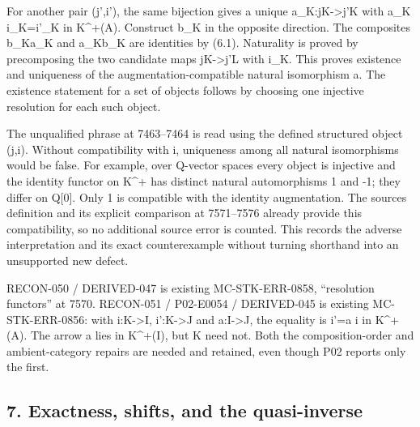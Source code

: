 \documentclass[11pt]{article}
\begin{document}
For another pair (j',\allowbreak{}i')\allowbreak{},\allowbreak{} the same bijection gives a unique a\_\allowbreak{}K:\allowbreak{}jK\allowbreak{}->j'K with a\_\allowbreak{}K i\_\allowbreak{}K\allowbreak{}=i'\_\allowbreak{}K in K\textasciicircum{}\allowbreak{}+(A)\allowbreak{}. Construct b\_\allowbreak{}K in the opposite direction. The composites b\_\allowbreak{}Ka\_\allowbreak{}K and a\_\allowbreak{}Kb\_\allowbreak{}K are identities by (6.1)\allowbreak{}. Naturality is proved by precomposing the two candidate maps jK\allowbreak{}->j'L with i\_\allowbreak{}K. This proves existence and uniqueness of the augmentation-compatible natural isomorphism a. The existence statement for a set of objects follows by choosing one injective resolution for each such object.

The unqualified phrase at 7463–\allowbreak{}7464 is read using the defined structured object (j,\allowbreak{}i)\allowbreak{}. Without compatibility with i,\allowbreak{} uniqueness among all natural isomorphisms would be false. For example,\allowbreak{} over Q-vector spaces every object is injective and the identity functor on K\textasciicircum{}\allowbreak{}+ has distinct natural automorphisms 1 and -1; they differ on Q[0]\allowbreak{}. Only 1 is compatible with the identity augmentation. The source\textquotesingle s definition and its explicit comparison at 7571–\allowbreak{}7576 already provide this compatibility,\allowbreak{} so no additional source error is counted. This records the adverse interpretation and its exact counterexample without turning shorthand into an unsupported new defect.

RECON-050 /\allowbreak{} DERIVED-047 is existing MC-STK-ERR-0858,\allowbreak{} ``resolution functors'' at 7570. RECON-051 /\allowbreak{} P02-E0054 /\allowbreak{} DERIVED-045 is existing MC-STK-ERR-0856:\allowbreak{} with i:\allowbreak{}K\allowbreak{}->I,\allowbreak{} i':\allowbreak{}K\allowbreak{}->J and a:\allowbreak{}I\allowbreak{}->J,\allowbreak{} the equality is i'\allowbreak{}=a i in K\textasciicircum{}\allowbreak{}+(A)\allowbreak{}. The arrow a lies in K\textasciicircum{}\allowbreak{}+(I)\allowbreak{},\allowbreak{} but K need not. Both the composition-order and ambient-category repairs are needed and retained,\allowbreak{} even though P02 reports only the first.

\subsection{\texorpdfstring{7. Exactness,\allowbreak{} shifts,\allowbreak{} and the quasi-inverse}{7.   and the quasi-inverse}}\label{proofs-7096-7578-exactness-shifts-and-the-quasi-inverse}
\end{document}
